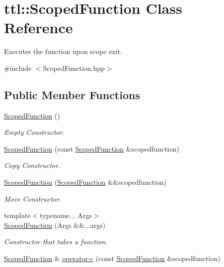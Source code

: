 \hypertarget{classttl_1_1_scoped_function}{\section{ttl\-:\-:Scoped\-Function Class Reference}
\label{classttl_1_1_scoped_function}
}


Executes the function upon scope exit.  




{\ttfamily \#include $<$Scoped\-Function.\-hpp$>$}

\subsection*{Public Member Functions}
\begin{DoxyCompactItemize}
\item 
\hyperlink{classttl_1_1_scoped_function_a24ebe31d085200e2d55098c57576fa93}{Scoped\-Function} ()
\begin{DoxyCompactList}\small\item\em Empty Constructor. \end{DoxyCompactList}\item 
\hyperlink{classttl_1_1_scoped_function_aed82cab381814166c5c58e9b7bb3fd9f}{Scoped\-Function} (const \hyperlink{classttl_1_1_scoped_function}{Scoped\-Function} \&scopedfunction)
\begin{DoxyCompactList}\small\item\em Copy Constructor. \end{DoxyCompactList}\item 
\hyperlink{classttl_1_1_scoped_function_a2c0d4468002ff084d8849c811466c884}{Scoped\-Function} (\hyperlink{classttl_1_1_scoped_function}{Scoped\-Function} \&\&scopedfunction)
\begin{DoxyCompactList}\small\item\em Move Constructor. \end{DoxyCompactList}\item 
{\footnotesize template$<$typename... Args$>$ }\\\hyperlink{classttl_1_1_scoped_function_a9056d0fc86869e5f8b7d710c9150173d}{Scoped\-Function} (Args \&\&...args)
\begin{DoxyCompactList}\small\item\em Constructor that takes a function. \end{DoxyCompactList}\item 
\hyperlink{classttl_1_1_scoped_function}{Scoped\-Function} \& \hyperlink{classttl_1_1_scoped_function_ab125f3042dcfcc167511339fb0e69a21}{operator=} (const \hyperlink{classttl_1_1_scoped_function}{Scoped\-Function} \&scopedfunction)

\end{DoxyCompactItemize}
